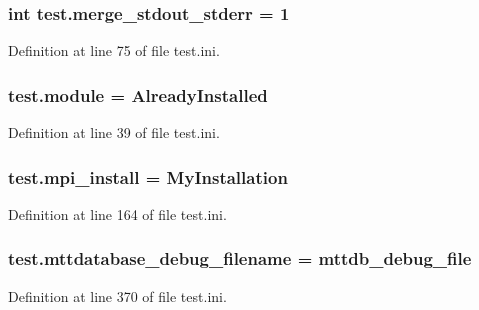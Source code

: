 \hypertarget{namespacetest_ab42f6c72b039645ef575cfb31b7b99e8}{
\subsubsection[{merge\-\_\-stdout\-\_\-stderr}]{\setlength{\rightskip}{0pt plus 5cm}int test.\-merge\-\_\-stdout\-\_\-stderr = 1}}\label{namespacetest_ab42f6c72b039645ef575cfb31b7b99e8}


Definition at line 75 of file test.\-ini.

\hypertarget{namespacetest_ab75fa7ca9f0cb2bcac8a454434a9f2ed}{
\subsubsection[{module}]{\setlength{\rightskip}{0pt plus 5cm}test.\-module = Already\-Installed}}\label{namespacetest_ab75fa7ca9f0cb2bcac8a454434a9f2ed}


Definition at line 39 of file test.\-ini.

\hypertarget{namespacetest_a295e67a63678237853b86e59182db440}{
\subsubsection[{mpi\-\_\-install}]{\setlength{\rightskip}{0pt plus 5cm}test.\-mpi\-\_\-install = My\-Installation}}\label{namespacetest_a295e67a63678237853b86e59182db440}


Definition at line 164 of file test.\-ini.

\hypertarget{namespacetest_ad8091a4ab1a4450f8e8c7039d81bbd92}{
\subsubsection[{mttdatabase\-\_\-debug\-\_\-filename}]{\setlength{\rightskip}{0pt plus 5cm}test.\-mttdatabase\-\_\-debug\-\_\-filename = mttdb\-\_\-debug\-\_\-file}}\label{namespacetest_ad8091a4ab1a4450f8e8c7039d81bbd92}


Definition at line 370 of file test.\-ini.

